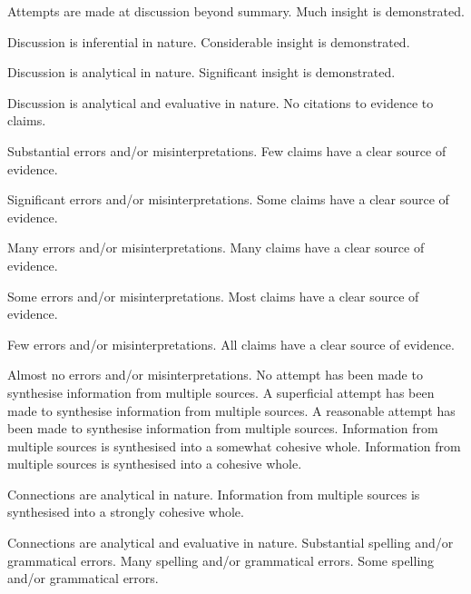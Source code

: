 \documentclass{../../fal_assignment}
\begin{document}
\begin{markingrubric}
        \par		Attempts are made at discussion beyond summary.
        \grade		Much insight is demonstrated.
        \par		Discussion is inferential in nature.
        \grade		Considerable insight is demonstrated.
        \par		Discussion is analytical in nature.
        \grade		Significant insight is demonstrated.
        \par		Discussion is analytical and evaluative in nature.
%
        \grade\fail 	No citations to evidence to claims.
        \par 		Substantial errors and/or misinterpretations.
        \grade 		Few claims have a clear source of evidence.
        \par 		Significant errors and/or misinterpretations.
        \grade 		Some claims have a clear source of evidence.
        \par 		Many errors and/or misinterpretations.
        \grade 		Many claims have a clear source of evidence.
        \par 		Some errors and/or misinterpretations.
        \grade 		Most claims have a clear source of evidence.
        \par 		Few errors and/or misinterpretations.
        \grade 		All claims have a clear source of evidence.
        \par 		Almost no errors and/or misinterpretations.
%
        \grade\fail No attempt has been made to synthesise information from multiple sources.
        \grade		A superficial attempt has been made to synthesise information from multiple sources.
        \grade		A reasonable attempt has been made to synthesise information from multiple sources.
        \grade		Information from multiple sources is synthesised into a somewhat cohesive whole.
        \grade		Information from multiple sources is synthesised into a cohesive whole.
        \par		Connections are analytical in nature.
        \grade		Information from multiple sources is synthesised into a strongly cohesive whole.
        \par		Connections are analytical and evaluative in nature.
%
        \grade\fail 	Substantial spelling and/or grammatical errors.
        \grade 		Many spelling and/or grammatical errors.
        \grade 		Some spelling and/or grammatical errors.  

\end{markingrubric}
\end{document}
